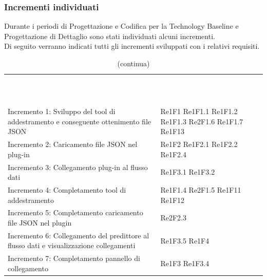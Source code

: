 \pagebreak
\subsubsection{Incrementi individuati}
Durante i periodi di Progettazione e Codifica per la Technology Baseline e Progettazione di Dettaglio sono stati individuati alcuni incrementi. \\
Di seguito verranno indicati tutti gli incrementi sviluppati con i relativi requisiti.

\begin{longtable}{C{4cm} L{3cm}}
\caption{Tracciamento incrementi} \\
\textcolor{white}{\textbf{Incremento}} &
\textcolor{white}{\textbf{Requisiti}} \\
		\endfirsthead
		\caption[]{(continua)} \\
\textcolor{white}{\textbf{Incremento}} &
\textcolor{white}{\textbf{Requisiti}} \\
		\endhead
Incremento 1: Sviluppo del tool di addestramento e conseguente ottenimento file JSON & Re1F1 \newline Re1F1.1  \newline Re1F1.2 \newline Re1F1.3 \newline Re2F1.6 \newline Re1F1.7 \newline Re1F13 \\
Incremento 2: Caricamento file JSON	nel plug-in & Re1F2 \newline Re1F2.1 \newline Re1F2.2  \newline Re1F2.4\\
Incremento 3: Collegamento plug-in al flusso dati & Re1F3.1 \newline Re1F3.2
\\
Incremento 4: Completamento tool di addestramento & Re1F1.4 \newline Re2F1.5 \newline Re1F11 \newline Re1F12
\\
Incremento 5: Completamento caricamento file JSON nel plugin & Re2F2.3
\\
Incremento 6: Collegamento del predittore al flusso dati e visualizzazione collegamenti & Re1F3.5 \newline Re1F4
\\
Incremento 7: Completamento pannello di collegamento & Re1F3 \newline Re1F3.4

\end{longtable}
